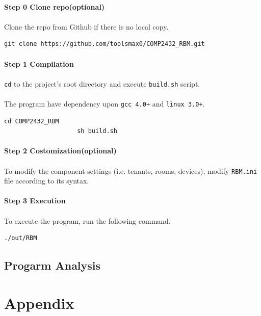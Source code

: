\documentclass{article}
\begin{document}
            \paragraph{Step 0 Clone repo(optional)}
            \paragraph{}
                Clone the repo from Github if there is no local copy.
                \begin{Verbatim}[gobble=8]
                    git clone https://github.com/toolsmax0/COMP2432_RBM.git
                \end{Verbatim}
            \paragraph{Step 1 Compilation}
            \paragraph{}
                \texttt{cd} to the project's root directory and execute \texttt{build.sh} script.
            \paragraph{}
                The program have dependency upon \texttt{gcc 4.0+} and \texttt{linux 3.0+}.
                \begin{Verbatim}[gobble=8]
                    cd COMP2432_RBM
                    sh build.sh
                \end{Verbatim}
            \paragraph{Step 2 Costomization(optional)}
            \paragraph{}
                To modify the component settings (i.e. tenants, rooms, devices),
                modify \texttt{RBM.ini} file according to its syntax.
            \paragraph{Step 3 Execution}
            \paragraph{}
                To execute the program, run the following command.
                \begin{Verbatim}[gobble=8]
                    ./out/RBM
                \end{Verbatim}

        \subsection{Progarm Analysis}

    \cleardoublepage
    \section{Appendix}
\end{document}
